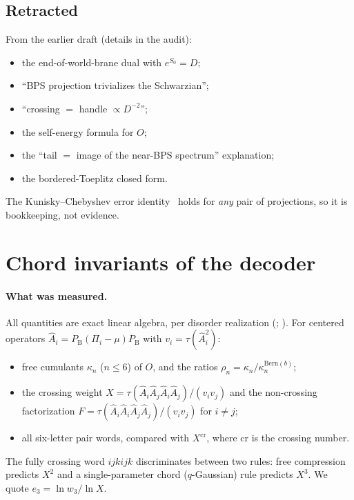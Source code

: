 \documentclass[11pt]{article}
\newcommand{\PB}{P_{\mathrm B}}
\newcommand{\Bern}{\mathrm{Bern}}
\newcommand{\eS}{e^{S_0}}
\theoremstyle{remark}
\begin{document}
\subsection{Retracted}
From the earlier draft (details in the audit):
\begin{itemize}\itemsep1pt
\item the end-of-world-brane dual with $\eS=D$;
\item ``BPS projection trivializes the Schwarzian'';
\item ``crossing $=$ handle $\propto D^{-2}$'';
\item the self-energy formula for $O$;
\item the ``tail $=$ image of the near-BPS spectrum'' explanation;
\item the bordered-Toeplitz closed form.
\end{itemize}
The Kunisky--Chebyshev error identity~\cite{Kunisky} holds for \emph{any} pair of projections, so it is bookkeeping,
not evidence.

\section{Chord invariants of the decoder}\label{sec:campaign}

\paragraph{What was measured.} All quantities are exact linear algebra, per disorder realization
(; ). For centered
operators $\hat A_i=\PB(\Pi_i-\mu)\PB$ with $v_i=\tau(\hat A_i^2)$:
\begin{itemize}\itemsep1pt
\item free cumulants $\kappa_n$ ($n\le6$) of $O$, and the ratios $\rho_n=\kappa_n/\kappa_n^{\Bern(b)}$;
\item the crossing weight $X=\tau(\hat A_i\hat A_j\hat A_i\hat A_j)/(v_iv_j)$ and the non-crossing factorization
  $F=\tau(\hat A_i\hat A_i\hat A_j\hat A_j)/(v_iv_j)$ for $i\neq j$;
\item all six-letter pair words, compared with $X^{\mathrm{cr}}$, where cr is the crossing number.
\end{itemize}
The fully crossing word $ijkijk$ discriminates between two rules: free compression predicts $X^2$ and a
single-parameter chord ($q$-Gaussian) rule predicts $X^3$. We quote $e_3=\ln w_3/\ln X$.
\end{document}
